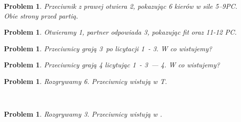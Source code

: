 \documentclass[12pt, a4paper]{article}
\newtheorem{problem}[table]{Problem}
\begin{document}
\begin{problem}
    Przeciwnik z prawej otwiera \emph{2\hearts}, pokazując 6 kierów w sile \emph{5--9PC}. 
    Obie strony przed partią.
\end{problem}
\begin{center}
\end{center}

\begin{problem}
    Otwieramy \emph{1\spades}, partner odpowiada \emph{3\spades}, pokazując fit oraz 11-12 PC.
\end{problem}
\begin{center}
\end{center}

\begin{problem}
    Przeciwnicy grają 3\nt\ po licytacji 1\nt\ - 3\nt. W co wistujemy?
\end{problem}
\begin{center}
\end{center}

\begin{problem}
    Przeciwnicy grają \emph{4\hearts} licytując \emph{1\hearts\ - 3\hearts\ --- 4\hearts}. W co wistujemy?
\end{problem}
\begin{center}
\end{center}

\begin{problem}
    Rozgrywamy \emph{6\spades}. Przeciwnicy wistują w \emph{\hearts T}.
\end{problem}
\begin{center}
     \\[7mm]
\end{center}

\begin{problem}
    Rozgrywamy \emph{3\nt}. Przeciwnicy wistują w \emph{}.
\end{problem}
\begin{center}
     \\[7mm]
\end{center}
\end{document}
